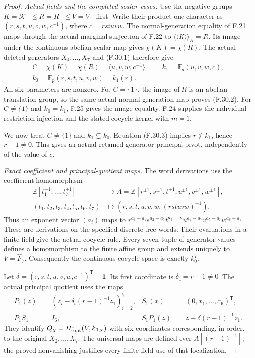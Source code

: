 \begin{proof}
\emph{Actual fields and the completed scalar cases.}
Use the negative groups $K=\mathcal K_-\leq R=R_-\leq V=V_-$
first. Write their product-one character as
$(r,s,t,u,v,w,c^{-1})$, where $c=rstuvw$.
The normal-generation equality of F.21 maps
through the actual marginal surjection of F.22
to $\overline{\langle\!\langle K\rangle\!\rangle}_R=R$.
Its image under the continuous abelian scalar
map gives $\chi(K)=\chi(R)$.
The actual deleted generators $X_4,\ldots,X_7$
and (F.30.1) therefore give
\[
 \begin{gathered}
 C=\chi(K)=\chi(R)=\langle u,v,w,c^{-1}\rangle,
 \qquad k_1=\mathbb F_p(u,v,w,c),\\
 k_0=\mathbb F_p(r,s,t,u,v,w)=k_1(r).
 \end{gathered}                                                \tag{F.30.3}
\]
All six parameters are nonzero.
For $C=\{1\}$, the image of $R$ is an abelian
translation group, so the same actual
normal-generation map proves (F.30.2).
For $C\ne\{1\}$ and $k_0=k_1$, F.25 gives
the image equality. F.24 supplies the individual
restriction injection and the stated cocycle
kernel with $m=1$.

We now treat $C\ne\{1\}$ and $k_1\subsetneq k_0$.
Equation (F.30.3) implies $r\notin k_1$, hence
$r-1\ne0$. This gives an actual retained-generator
principal pivot, independently of the value of $c$.

\emph{Exact coefficient and principal-quotient maps.}
The word derivations use the coefficient homomorphism
\[
 \begin{aligned}
 \mathbb Z[t_1^{\pm1},\ldots,t_7^{\pm1}]
    &\longrightarrow A=
       \mathbb Z[r^{\pm1},s^{\pm1},t^{\pm1},u^{\pm1},v^{\pm1},w^{\pm1}],\\
 (t_1,t_2,t_3,t_4,t_5,t_6,t_7)
    &\longmapsto(r,s,t,u,v,w,(rstuvw)^{-1}).
 \end{aligned}                                                \tag{F.30.4}
\]
Thus an exponent vector $(a_i)$ maps to
$r^{a_1-a_7}s^{a_2-a_7}t^{a_3-a_7}
 u^{a_4-a_7}v^{a_5-a_7}w^{a_6-a_7}$.
These are derivations on the specified discrete
free words. Their evaluations in a finite field
give the actual cocycle rule.
Every seven-tuple of generator values defines
a homomorphism to the finite affine group
and extends uniquely to $V=\widehat F_7$.
Consequently the continuous cocycle space is
exactly $k_0^7$.

Let $\delta=(r,s,t,u,v,w,c^{-1})^{\mathsf T}-\mathbf1$.
Its first coordinate is $\delta_1=r-1\ne0$.
The actual principal quotient uses the maps
\[
 \begin{aligned}
 P_1(z)&=(z_i-\delta_i(r-1)^{-1}z_1)_{i=2}^7,
       &S_1(x)&=(0,x_1,\ldots,x_6)^{\mathsf T},\\
 P_1S_1&=I_6,
       &S_1P_1(z)&=z-\delta(r-1)^{-1}z_1.
 \end{aligned}                                                \tag{F.30.5}
\]
They identify
$Q_\chi=H^1_{\rm cont}(V,k_{0,\chi})$
with six coordinates corresponding, in order,
to the original $X_2,\ldots,X_7$.
The universal maps are defined over $A[(r-1)^{-1}]$;
the proved nonvanishing justifies every
finite-field use of that localization.


\end{proof}

